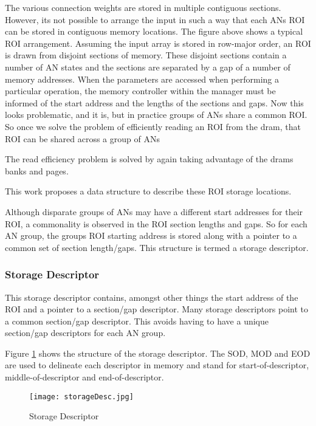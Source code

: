 The various connection weights are stored in multiple contiguous sections. However, its not possible to arrange the input in such a way that each ANs ROI can be stored in contiguous memory locations. The figure above shows a typical ROI arrangement. Assuming the input array is stored in row-major order, an ROI is drawn from disjoint sections of memory. 
These disjoint sections contain a number of AN states and the sections are separated by a gap of a number of memory addresses. When the parameters are accessed when performing a particular operation, the memory controller within the manager must be informed of the start address and the lengths of the sections and gaps. Now this looks problematic, and it is, but in practice groups of ANs share a common ROI. So once we solve the problem of efficiently reading an ROI from the \ac{dram}, that ROI can be shared across a group of ANs

The read efficiency problem is solved by again taking advantage of the \ac{dram}s banks and pages.

This work proposes a data structure to describe these ROI storage locations.

Although disparate groups of ANs may have a different start addresses for their ROI, a commonality is observed in the ROI section lengths and gaps. So for each AN group, the groups ROI starting address is stored along with a pointer to a common set of section length/gaps. This structure is termed a storage descriptor.

\subsubsection{Storage Descriptor}
\label{sec:Storage Descriptor}

This storage descriptor contains, amongst other things the start address of the ROI and a pointer to a section/gap descriptor. Many storage descriptors point to a common section/gap descriptor. This avoids having to have a unique section/gap descriptors for each AN group.

Figure \ref{fig:storageDescriptor} shows the structure of the storage descriptor. The SOD, MOD and EOD are used to delineate each descriptor in memory and stand for start-of-descriptor, middle-of-descriptor and end-of-descriptor.

\begin{figure}[!t]
\centering
\captionsetup{justification=centering}
\captionsetup{width=.9\linewidth}
\centerline{
\mbox{\texttt{[image: storageDesc.jpg]}}
}
\caption{Storage Descriptor}
\label{fig:storageDescriptor}
\end{figure}

